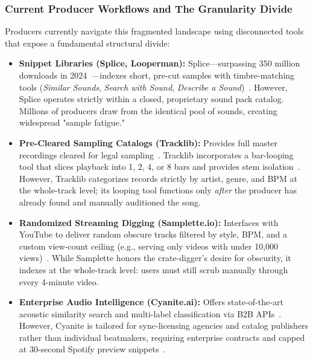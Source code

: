 \subsubsection*{Current Producer Workflows and The Granularity Divide}
Producers currently navigate this fragmented landscape using disconnected tools that expose a fundamental structural divide:
\begin{itemize}
    \item \textbf{Snippet Libraries (Splice, Looperman):} Splice---surpassing 350 million downloads in 2024~\cite{ref:mbw_splice}---indexes short, pre-cut samples with timbre-matching tools (\textit{Similar Sounds}, \textit{Search with Sound}, \textit{Describe a Sound})~\cite{ref:splice_similar, ref:splice_plugin, ref:splice_support_describe, ref:splice_support_search}. However, Splice operates strictly within a closed, proprietary sound pack catalog. Millions of producers draw from the identical pool of sounds, creating widespread "sample fatigue."
    \item \textbf{Pre-Cleared Sampling Catalogs (Tracklib):} Provides full master recordings cleared for legal sampling~\cite{ref:tracklib2022, ref:tracklib_press, ref:routenote_tracklib}. Tracklib incorporates a bar-looping tool that slices playback into 1, 2, 4, or 8 bars and provides stem isolation~\cite{ref:attackmag2022_tracklib, ref:mbw2024b_sounds}. However, Tracklib categorizes records strictly by artist, genre, and BPM at the whole-track level; its looping tool functions only \textit{after} the producer has already found and manually auditioned the song.
    \item \textbf{Randomized Streaming Digging (Samplette.io):} Interfaces with YouTube to deliver random obscure tracks filtered by style, BPM, and a custom view-count ceiling (e.g., serving only videos with under 10,000 views)~\cite{ref:samplette, ref:musicradar_samplette, ref:weraveyou2025_youtube}. While Samplette honors the crate-digger's desire for obscurity, it indexes at the whole-track level: users must still scrub manually through every 4-minute video.
    \item \textbf{Enterprise Audio Intelligence (Cyanite.ai):} Offers state-of-the-art acoustic similarity search and multi-label classification via B2B APIs~\cite{ref:cyanite_advanced_blog, ref:cyanite_api_adv, ref:cyanite_api_sim, ref:cyanite_api_text, ref:cyanite_music_api, ref:cyanite_sim_finder}. However, Cyanite is tailored for sync-licensing agencies and catalog publishers rather than individual beatmakers, requiring enterprise contracts and capped at 30-second Spotify preview snippets~\cite{ref:cyanite_guide}.
\end{itemize}

